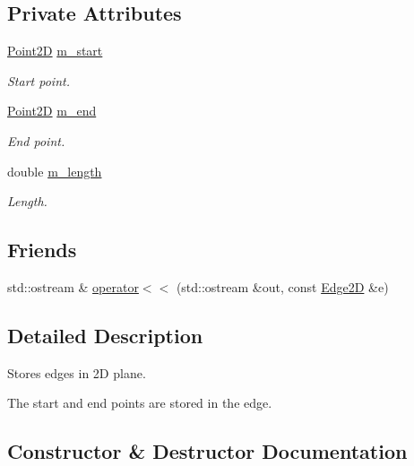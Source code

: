 \subsection*{Private Attributes}
\begin{DoxyCompactItemize}
\item 
\hyperlink{classcmst_1_1_point2_d}{Point2D} \hyperlink{classcmst_1_1_edge2_d_a8c0ca77824a84a48c714aaec5da72ad7}{m\+\_\+start}
\begin{DoxyCompactList}\small\item\em Start point. \end{DoxyCompactList}\item 
\hyperlink{classcmst_1_1_point2_d}{Point2D} \hyperlink{classcmst_1_1_edge2_d_a26aabda4fcc506ae340392e78f92e49b}{m\+\_\+end}
\begin{DoxyCompactList}\small\item\em End point. \end{DoxyCompactList}\item 
double \hyperlink{classcmst_1_1_edge2_d_ab461fb636aa7f76af613c63c681c186e}{m\+\_\+length}
\begin{DoxyCompactList}\small\item\em Length. \end{DoxyCompactList}\end{DoxyCompactItemize}
\subsection*{Friends}
\begin{DoxyCompactItemize}
\item 
std\+::ostream \& \hyperlink{classcmst_1_1_edge2_d_ae312c205375d240b1c8bc889f2c1c55e}{operator$<$$<$} (std\+::ostream \&out, const \hyperlink{classcmst_1_1_edge2_d}{Edge2D} \&e)
\end{DoxyCompactItemize}


\subsection{Detailed Description}
Stores edges in 2D plane.

The start and end points are stored in the edge. 

\subsection{Constructor \& Destructor Documentation}
